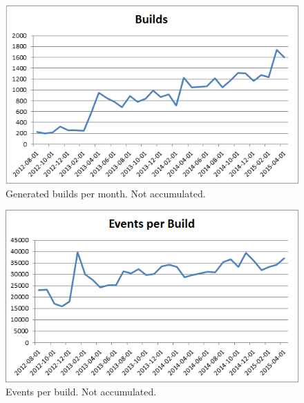 \begin{figure}[h!]
\centering
\includegraphics[]{figure/builds.png}
\caption{Generated builds per month. Not accumulated.}
\label{fig:builds}
\end{figure}

\begin{figure}[h!]
\centering
\includegraphics[]{figure/events_per_build.png}
\caption{Events per build. Not accumulated.}
\label{fig:events_per_build}
\end{figure}



